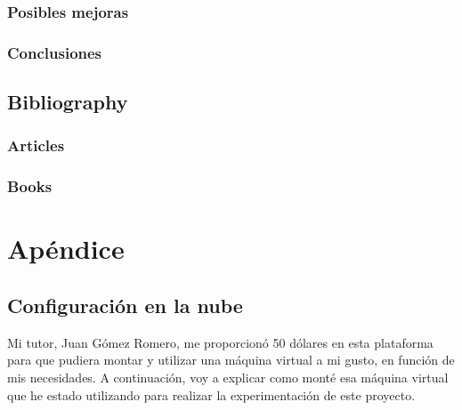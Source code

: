 \documentclass[11pt,fleqn]{book} %
\begin{document}
\section{Posibles mejoras}

\section{Conclusiones}


\chapter*{Bibliography}


\section*{Articles}
\printbibliography[heading=bibempty,type=article]


\section*{Books}
\printbibliography[heading=bibempty,type=book]


\appendix

\part{Apéndice}
\usechapterimagefalse
\chapter{Configuración en la nube}\label{sec:googlecloud}

Mi tutor, Juan Gómez Romero, me proporcionó 50 dólares en esta plataforma para que pudiera montar y utilizar una máquina virtual a mi gusto, en función de mis necesidades. A continuación, voy a explicar como monté esa máquina virtual que he estado utilizando para realizar la experimentación de este proyecto. \\
\end{document}
